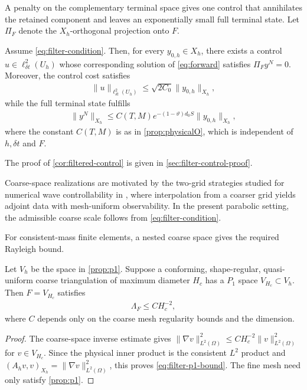 \documentclass[print,wide,eng]{draft}
\begin{document}
A penalty on the complementary terminal space gives one control that annihilates the retained component and leaves an exponentially small full terminal state. Let $\Pi_F$ denote the $X_h$-orthogonal projection onto $F$.
%
\begin{corollary}\label{cor:filtered-control}
Assume \cref{eq:filter-condition}. Then, for every $y_{0,h}\in X_h$, there exists a control $u\in\ell_{\delta t}^2(U_h)$ whose corresponding solution of \cref{eq:forward} satisfies $\Pi_Fy^N=0$.
Moreover, the control cost satisfies
%
\begin{align}\label{eq:filtered-control}
\|u\|_{\ell_{\delta t}^2(U_h)}\le\sqrt{2C_0}\|y_{0,h}\|_{X_h},
\end{align}
%
while the full terminal state fulfills
%
\begin{align}\label{eq:filtered-terminal}
\|y^N\|_{X_h}\le C(T,M)e^{-(1-\vartheta)d_0S}\|y_{0,h}\|_{X_h},
\end{align}
%
where the constant $C(T,M)$ is as in \cref{prop:physicalO}, which is independent of $h,\delta t$ and $F$.
\end{corollary}
%
The proof of \cref{cor:filtered-control} is given in \cref{sec:filter-control-proof}.

Coarse-space realizations are motivated by the two-grid strategies studied for numerical wave controllability in \cite{NegreanuZuazua2004,IgnatZuazua2009}, where interpolation from a coarser grid yields adjoint data with mesh-uniform observability. In the present parabolic setting, the admissible coarse scale follows from \cref{eq:filter-condition}.

For consistent-mass finite elements, a nested coarse space gives the required Rayleigh bound.
%
\begin{proposition}\label{prop:filter-p1}
Let $V_h$ be the space in \cref{prop:p1}. Suppose a conforming, shape-regular, quasi-uniform coarse triangulation of maximum diameter $H_c$ has a $P_1$ space $V_{H_c}\subset V_h$. Then $F=V_{H_c}$ satisfies
%
\begin{align}\label{eq:filter-p1-bound}
\Lambda_F\leq CH_c^{-2},
\end{align}
%
where $C$ depends only on the coarse mesh regularity bounds and the dimension.
\end{proposition}
%
\begin{proof}
The coarse-space inverse estimate gives $\|\nabla v\|_{L^2(\Omega)}^2\leq CH_c^{-2}\|v\|_{L^2(\Omega)}^2$ for $v\in V_{H_c}$. Since the physical inner product is the consistent $L^2$ product and $(A_hv,v)_{X_h}=\|\nabla v\|_{L^2(\Omega)}^2$, this proves \cref{eq:filter-p1-bound}. The fine mesh need only satisfy \cref{prop:p1}.
\end{proof}
%
\end{document}
